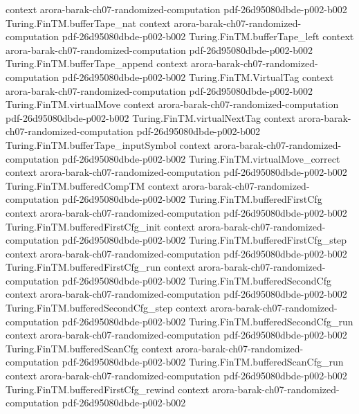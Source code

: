 \begin{theorem}
  {context}
  {arora-barak-ch07-randomized-computation}
  {pdf-26d95080dbde-p002-b002}
\proofstep
  {Turing.FinTM.bufferTape_nat}
  {context}
  {arora-barak-ch07-randomized-computation}
  {pdf-26d95080dbde-p002-b002}
\proofstep
  {Turing.FinTM.bufferTape_left}
  {context}
  {arora-barak-ch07-randomized-computation}
  {pdf-26d95080dbde-p002-b002}
\proofstep
  {Turing.FinTM.bufferTape_append}
  {context}
  {arora-barak-ch07-randomized-computation}
  {pdf-26d95080dbde-p002-b002}
\proofstep
  {Turing.FinTM.VirtualTag}
  {context}
  {arora-barak-ch07-randomized-computation}
  {pdf-26d95080dbde-p002-b002}
\proofstep
  {Turing.FinTM.virtualMove}
  {context}
  {arora-barak-ch07-randomized-computation}
  {pdf-26d95080dbde-p002-b002}
\proofstep
  {Turing.FinTM.virtualNextTag}
  {context}
  {arora-barak-ch07-randomized-computation}
  {pdf-26d95080dbde-p002-b002}
\proofstep
  {Turing.FinTM.bufferTape_inputSymbol}
  {context}
  {arora-barak-ch07-randomized-computation}
  {pdf-26d95080dbde-p002-b002}
\proofstep
  {Turing.FinTM.virtualMove_correct}
  {context}
  {arora-barak-ch07-randomized-computation}
  {pdf-26d95080dbde-p002-b002}
\proofstep
  {Turing.FinTM.bufferedCompTM}
  {context}
  {arora-barak-ch07-randomized-computation}
  {pdf-26d95080dbde-p002-b002}
\proofstep
  {Turing.FinTM.bufferedFirstCfg}
  {context}
  {arora-barak-ch07-randomized-computation}
  {pdf-26d95080dbde-p002-b002}
\proofstep
  {Turing.FinTM.bufferedFirstCfg_init}
  {context}
  {arora-barak-ch07-randomized-computation}
  {pdf-26d95080dbde-p002-b002}
\proofstep
  {Turing.FinTM.bufferedFirstCfg_step}
  {context}
  {arora-barak-ch07-randomized-computation}
  {pdf-26d95080dbde-p002-b002}
\proofstep
  {Turing.FinTM.bufferedFirstCfg_run}
  {context}
  {arora-barak-ch07-randomized-computation}
  {pdf-26d95080dbde-p002-b002}
\proofstep
  {Turing.FinTM.bufferedSecondCfg}
  {context}
  {arora-barak-ch07-randomized-computation}
  {pdf-26d95080dbde-p002-b002}
\proofstep
  {Turing.FinTM.bufferedSecondCfg_step}
  {context}
  {arora-barak-ch07-randomized-computation}
  {pdf-26d95080dbde-p002-b002}
\proofstep
  {Turing.FinTM.bufferedSecondCfg_run}
  {context}
  {arora-barak-ch07-randomized-computation}
  {pdf-26d95080dbde-p002-b002}
\proofstep
  {Turing.FinTM.bufferedScanCfg}
  {context}
  {arora-barak-ch07-randomized-computation}
  {pdf-26d95080dbde-p002-b002}
\proofstep
  {Turing.FinTM.bufferedScanCfg_run}
  {context}
  {arora-barak-ch07-randomized-computation}
  {pdf-26d95080dbde-p002-b002}
\proofstep
  {Turing.FinTM.bufferedFirstCfg_rewind}
  {context}
  {arora-barak-ch07-randomized-computation}
  {pdf-26d95080dbde-p002-b002}

\end{theorem}
